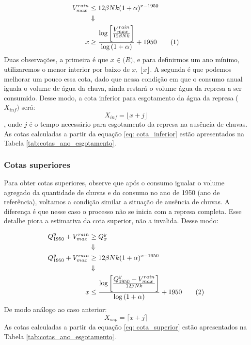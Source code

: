 \documentclass{article}
\newcommand\numberthis{\addtocounter{equation}{1}\tag{\theequation}}
\begin{document}
\begin{align*}
     V_{max}^{rain} &\leq 12\beta N k(1 + \alpha)^{x - 1950} \\
                             &\Downarrow \\
    x                        &\geq \frac{\log{\left[ \frac{\displaystyle V_{max}^{rain}}{12\beta Nk}\right]}}{\displaystyle \log{(1 + \alpha)}} + 1950 \numberthis \label{eq: anos_cota_inferior}
\end{align*}
Duas observações, a primeira é que $x \in \mathbb(R)$, e para definirmos um ano mínimo, utilizaremos o menor interior por baixo de $x$, $\lfloor x \rfloor$. A segunda é que podemos melhorar um pouco essa cota, dado que nessa condição em que o consumo anual iguala o volume de água da chuva, ainda restará o volume água da represa a ser consumido. Desse modo, a cota inferior para esgotamento da água da represa ($X_{inf})$ será:
\begin{equation}
\label{eq: cota_inferior}
    X_{inf} = \lfloor x + j  \rfloor
\end{equation},
onde $j$ é o tempo necessário para esgotamento da represa na ausência de chuvas. As cotas calculadas a partir da equação \ref{eq: cota_inferior} estão apresentados na Tabela \ref{tab:cotas_ano_esgotamento}.


\subsubsection*{Cotas superiores}
Para obter cotas superiores, observe que após o consumo igualar o volume agregado da quantidade de chuvas e do consumo no ano de 1950 (ano de referência), voltamos a condição similar a situação de ausência de chuvas. A diferença é que nesse caso o processo não se inicia com a represa completa. Esse detalhe piora a estimativa da cota superior, não a invalida. Desse modo:

\begin{align*}
    Q_{1950}^y + V_{max}^{rain} &\geq Q_x^y \\
                                &\Downarrow \\
    Q_{1950}^y + V_{max}^{rain} &\geq 12\beta N k(1 + \alpha)^{x - 1950} \\
                                &\Downarrow \\
    x                           &\leq \frac{\log{\left[ \frac{\displaystyle Q_{1950}^y + V_{max}^{rain}}{12\beta Nk}\right]}}{\displaystyle \log{(1 + \alpha)}} + 1950 \numberthis \label{eq: anos_cota_superior}
\end{align*}
De modo análogo ao caso anterior:
\begin{equation}
\label{eq: cota_superior}
    X_{sup} = \lceil x + j  \rceil
\end{equation}
As cotas calculadas a partir da equação \ref{eq: cota_superior} estão apresentados na Tabela \ref{tab:cotas_ano_esgotamento}.
\end{document}
